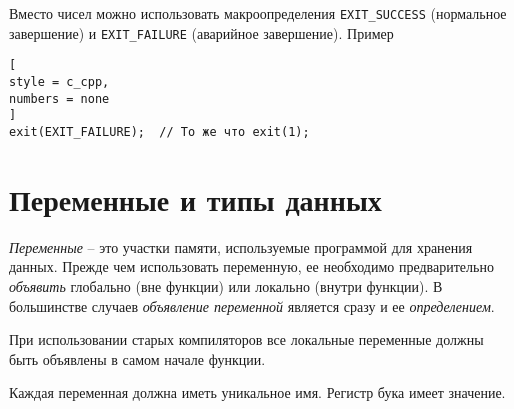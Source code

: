 \documentclass[%
	11pt,
	a4paper,
	utf8,
		]{article}
\begin{document}
Вместо чисел можно использовать макроопределения \verb|EXIT_SUCCESS| (нормальное завершение) и \verb*|EXIT_FAILURE| (аварийное завершение). Пример
\begin{lstlisting}[
style = c_cpp,
numbers = none
]
exit(EXIT_FAILURE);  // То же что exit(1);
\end{lstlisting}



\section{Переменные и типы данных}

\emph{Переменные} -- это участки памяти, используемые программой для хранения данных. Прежде чем использовать переменную, ее необходимо предварительно \emph{объявить} глобально (вне функции) или локально (внутри функции). В большинстве случаев \emph{объявление переменной} является сразу и ее \emph{определением}.

При использовании старых компиляторов все локальные переменные должны быть объявлены в самом начале функции.

Каждая переменная должна иметь уникальное имя. Регистр бука имеет значение.
\end{document}
